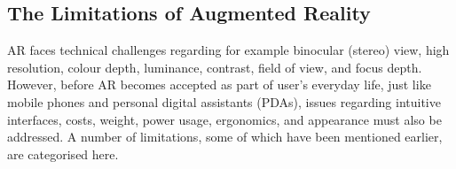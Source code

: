 \documentclass[preprint,12pt]{elsarticle}
\begin{document}
\subsection{The Limitations of Augmented Reality}
AR faces technical challenges regarding for example binocular (stereo) view, high resolution, colour depth, luminance, contrast, field of view, and focus depth. However, before AR becomes accepted as part of user's everyday life, just like mobile phones and personal digital assistants (PDAs), issues regarding intuitive interfaces, costs, weight, power usage, ergonomics, and appearance must also be addressed. A number of limitations, some of which have been mentioned earlier, are categorised here.


\end{document}
